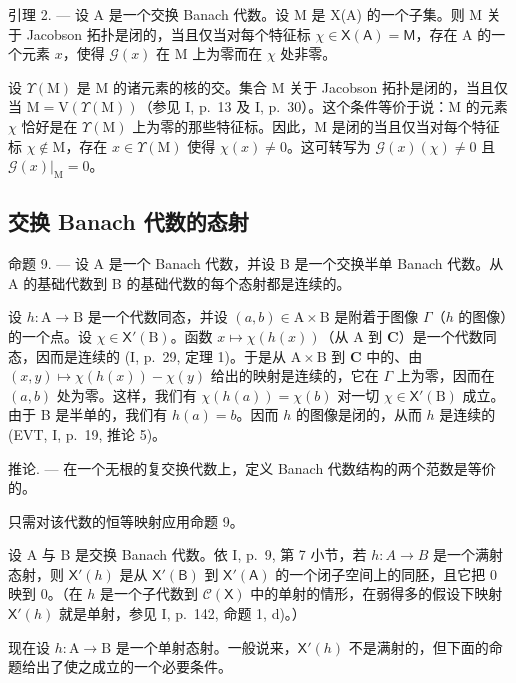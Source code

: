 引理 2. --- 设 A 是一个交换 Banach 代数。设 M 是 X(A) 的一个子集。则 M 关于 Jacobson 拓扑是闭的，当且仅当对每个特征标 \(\chi \in \mathsf{X}(\mathsf{A}) = \mathsf{M}\)，存在 A 的一个元素 \(x\)，使得 \(\mathcal{G}(x)\) 在 M 上为零而在 \(\chi\) 处非零。

设 \(\Upsilon(\mathrm{M})\) 是 M 的诸元素的核的交。集合 M 关于 Jacobson 拓扑是闭的，当且仅当 \(\mathrm{M} = \mathrm{V}(\Upsilon(\mathrm{M}))\)（参见 I, p.~13 及 I, p.~30）。这个条件等价于说：M 的元素 \(\chi\) 恰好是在 \(\Upsilon(\mathrm{M})\) 上为零的那些特征标。因此，M 是闭的当且仅当对每个特征标 \(\chi \notin \mathrm{M}\)，存在 \(x \in \Upsilon(\mathrm{M})\) 使得 \(\chi(x) \neq 0\)。这可转写为 \(\mathcal{G}(x)(\chi) \neq 0\) 且 \(\mathcal{G}(x)|_{\mathrm{M}} = 0\)。

\subsection{交换 Banach 代数的态射}

命题 9. --- 设 A 是一个 Banach 代数，并设 B 是一个交换半单 Banach 代数。从 A 的基础代数到 B 的基础代数的每个态射都是连续的。

设 \(h \colon \mathrm{A} \to \mathrm{B}\) 是一个代数同态，并设 \((a, b) \in \mathrm{A} \times \mathrm{B}\) 是附着于图像 \(\Gamma\)（\(h\) 的图像）的一个点。设 \(\chi \in \mathsf{X}'(\mathrm{B})\)。函数 \(x \mapsto \chi(h(x))\)（从 \(\mathrm{A}\) 到 \(\mathbf{C}\)）是一个代数同态，因而是连续的 (I, p.~29, 定理 1)。于是从 \(\mathrm{A} \times \mathrm{B}\) 到 \(\mathbf{C}\) 中的、由 \((x, y) \mapsto \chi(h(x)) - \chi(y)\) 给出的映射是连续的，它在 \(\Gamma\) 上为零，因而在 \((a, b)\) 处为零。这样，我们有 \(\chi(h(a)) = \chi(b)\) 对一切 \(\chi \in \mathsf{X}'(\mathrm{B})\) 成立。由于 B 是半单的，我们有 \(h(a) = b\)。因而 \(h\) 的图像是闭的，从而 \(h\) 是连续的 (EVT, I, p.~19, 推论 5)。

推论. --- 在一个无根的复交换代数上，定义 Banach 代数结构的两个范数是等价的。

只需对该代数的恒等映射应用命题 9。

设 A 与 B 是交换 Banach 代数。依 I, p.~9, 第 7 小节，若 \(h\colon A\to B\) 是一个满射态射，则 \(\mathsf{X}'(h)\) 是从 \(\mathsf{X}'(\mathsf{B})\) 到 \(\mathsf{X}'(\mathsf{A})\) 的一个闭子空间上的同胚，且它把 0 映到 0。（在 \(h\) 是一个子代数到 \(\mathcal{C}(\mathsf{X})\) 中的单射的情形，在弱得多的假设下映射 \(\mathsf{X}'(h)\) 就是单射，参见 I, p.~142, 命题 1, d)。）

现在设 \(h \colon \mathrm{A} \to \mathrm{B}\) 是一个单射态射。一般说来，\(\mathsf{X}'(h)\) 不是满射的，但下面的命题给出了使之成立的一个必要条件。

